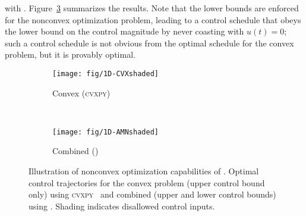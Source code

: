 with \amnet. Figure~\ref{fig:noncvx_control} summarizes the results. Note that
the lower bounds are enforced for the nonconvex optimization problem, leading
to a control schedule that obeys the lower bound on the control magnitude by
never coasting with $u(t)=0$; such a control schedule is not obvious from the
optimal schedule for the convex problem, but it is provably optimal.

\begin{figure}[tbp]
	\centering
	\begin{subfigure}{0.95\textwidth}
		\texttt{[image: fig/1D-CVXshaded]}
		\caption{Convex (\textsc{cvxpy})}
		\label{fig:noncvx_control_a}
	\end{subfigure}\\
	\begin{subfigure}{0.95\textwidth}
		\texttt{[image: fig/1D-AMNshaded]}
		\caption{Combined (\amnet)}
		\label{fig:noncvx_control_b}
	\end{subfigure}
	\caption{Illustration of nonconvex optimization capabilities of \amnet.
	Optimal control trajectories for the convex problem (upper control bound
	only) using \textsc{cvxpy}~\cite{cvxpy} 
	and  combined (upper and lower control bounds) using \amnet.
	Shading indicates disallowed control inputs.} 
	\label{fig:noncvx_control}
\end{figure}

\clearpage

